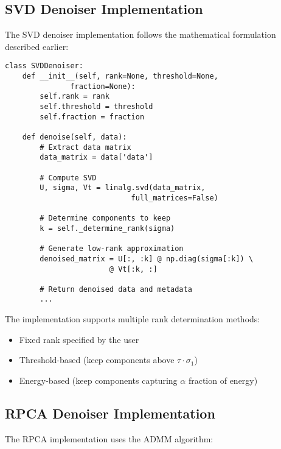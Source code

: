 \documentclass[10pt,twocolumn]{article}
\begin{document}
\subsection{SVD Denoiser Implementation}
The SVD denoiser implementation follows the mathematical formulation described earlier:

\begin{lstlisting}
class SVDDenoiser:
    def __init__(self, rank=None, threshold=None, 
               fraction=None):
        self.rank = rank
        self.threshold = threshold
        self.fraction = fraction
        
    def denoise(self, data):
        # Extract data matrix
        data_matrix = data['data']
        
        # Compute SVD
        U, sigma, Vt = linalg.svd(data_matrix, 
                             full_matrices=False)
        
        # Determine components to keep
        k = self._determine_rank(sigma)
        
        # Generate low-rank approximation
        denoised_matrix = U[:, :k] @ np.diag(sigma[:k]) \
                        @ Vt[:k, :]
                        
        # Return denoised data and metadata
        ...
\end{lstlisting}

The implementation supports multiple rank determination methods:
\begin{itemize}
\item Fixed rank specified by the user
\item Threshold-based (keep components above $\tau \cdot \sigma_1$)
\item Energy-based (keep components capturing $\alpha$ fraction of energy)
\end{itemize}

\subsection{RPCA Denoiser Implementation}
The RPCA implementation uses the ADMM algorithm:
\end{document}
